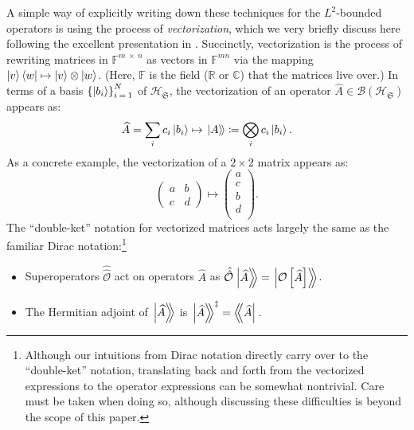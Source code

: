 \documentclass[preprints,article,accept,moreauthors,pdftex]{Definitions/mdpi}
\begin{document}
\begin{paracol}{2}
A simple way of explicitly writing down these techniques for the $L^{2}$-bounded operators is using the process of \emph{vectorization}, which we very briefly discuss here following the excellent presentation in \cite{Albert18}. Succinctly, vectorization is the process of rewriting matrices in $\mathbb{F}^{m\:\times\:n}$ as vectors in $\mathbb{F}^{mn}$ via the mapping $\ket{v}\bra{w}\mapsto\ket{v}\otimes\ket{w}$. (Here, $\mathbb{F}$ is the field ($\mathbb{R}$ or $\mathbb{C}$) that the matrices live over.) In terms of a basis $\left\{\ket{b_{i}}\right\}_{i\:=\:1}^{N}$ of $\mathcal{H}_{\mathfrak{S}}$, the vectorization of an operator $\widehat{A}\in\mathcal{B}\left(\mathcal{H}_{\mathfrak{S}}\right)$ appears as:
\begin{equation}
    \label{eq:vectorization}
    \widehat{A} = \sum\limits_{i}c_{i}\ket{b_{i}} \mapsto \left. \ket{A}\!\right\rangle \coloneqq \bigotimes\limits_{i}c_{i}\ket{b_{i}}.
\end{equation}
As a concrete example, the vectorization of a $2\times2$ matrix appears as:
\begin{equation*}
    \begin{pmatrix}
        a & b \\
        c & d
    \end{pmatrix}
    \mapsto
    \begin{pmatrix}
        a \\
        c \\
        b \\
        d \\
    \end{pmatrix}.
\end{equation*}
The ``double-ket'' notation for vectorized matrices acts largely the same as the familiar Dirac notation:\footnote{Although our intuitions from Dirac notation directly carry over to the ``double-ket'' notation, translating back and forth from the vectorized expressions to the operator expressions can be somewhat nontrivial. Care must be taken when doing so, although discussing these difficulties is beyond the scope of this paper.}
\begin{itemize}[labelindent=0mm,labelsep=1.25mm,leftmargin=*]
    \item Superoperators $\hat{\hat{\mathcal{O}}}$ act on operators $\widehat{A}$ as $\hat{\hat{\mathcal{O}}}\left.\ket{\widehat{A}}\!\!\right\rangle = \left.\ket{\mathcal{O}\left[\widehat{A}\right]}\!\!\right\rangle$. 
    \item The Hermitian adjoint of $\left.\ket{\widehat{A}}\!\!\right\rangle$ is $\left.\ket{\widehat{A}}\!\!\right\rangle^{\ddagger} = \left\langle\!\!\bra{\widehat{A}}\right.$.

\end{itemize}
\end{paracol}
\end{document}
